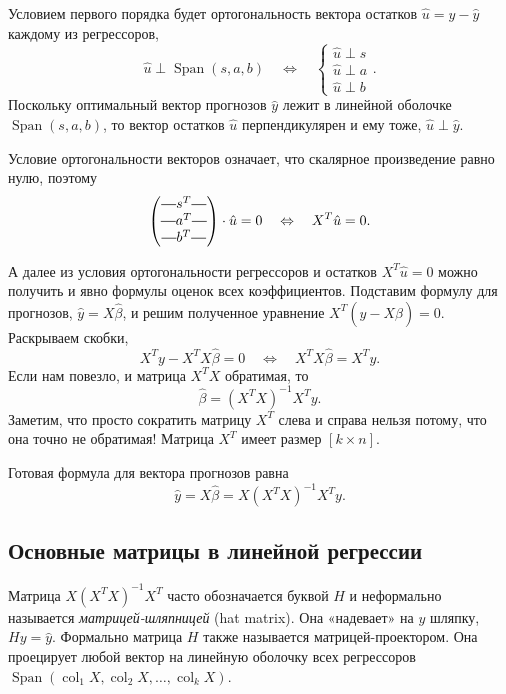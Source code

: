 \documentclass[12pt]{article}
\DeclareMathOperator{\col}{col}
\DeclareMathOperator{\Span}{Span}
\newcommand*{\horzbar}{\rule[.5ex]{2.5ex}{0.5pt}}
\newcommand{\hb}{\hat{\beta}}
\newcommand{\hu}{\hat{u}}
\newcommand{\hy}{\hat{y}}
\begin{document}
Условием первого порядка будет ортогональность вектора остатков $\hu = y - \hy$ каждому из регрессоров,
\[
\hu \perp \Span(s, a, b) \quad \Leftrightarrow \quad \begin{cases}
    \hu \perp s \\
    \hu \perp a \\
    \hu \perp b
\end{cases}.
\]
Поскольку оптимальный вектор прогнозов $\hy$ лежит в линейной оболочке $\Span(s, a, b)$, то вектор остатков $\hu$ перпендикулярен и ему тоже, $\hu \perp \hy$.

Условие ортогональности векторов означает, что скалярное произведение равно нулю, поэтому
\[
\begin{pmatrix}
    \horzbar s^T \horzbar \\
    \horzbar a^T \horzbar \\
    \horzbar b^T \horzbar \\
\end{pmatrix} \cdot \hu = 0 \quad \Leftrightarrow \quad X^T \hu = 0.
\]

А далее из условия ортогональности регрессоров и остатков $X^T \hu = 0$ можно получить и явно формулы оценок всех коэффициентов.
Подставим формулу для прогнозов, $\hy = X\hb$, и решим полученное уравнение $X^T (y - X\hb) = 0$.
Раскрываем скобки,
\[
X^T y - X^T X\hb = 0 \quad \Leftrightarrow \quad X^TX \hb = X^T y.
\]
Если нам повезло, и матрица $X^TX$ обратимая, то 
\[
\hb = (X^TX)^{-1} X^Ty.
\]
Заметим, что просто сократить матрицу $X^T$ слева и справа нельзя потому, что она точно не обратимая! 
Матрица $X^T$ имеет размер $[k \times n]$.

Готовая формула для вектора прогнозов равна 
\[
\hy = X\hb = X(X^TX)^{-1} X^Ty.
\]

\subsection{Основные матрицы в линейной регрессии}

\begin{definition}
Матрица $X(X^TX)^{-1} X^T$ часто обозначается буквой $H$ и неформально называется \emph{матрицей-шляпницей} (hat matrix).
Она «надевает» на $y$ шляпку, $Hy = \hat y$.
Формально матрица $H$ также называется матрицей-проектором. 
Она проецирует любой вектор на линейную оболочку всех регрессоров $\Span(\col_1 X, \col_2 X, \dots, \col_k X)$.
\end{definition}
\end{document}
